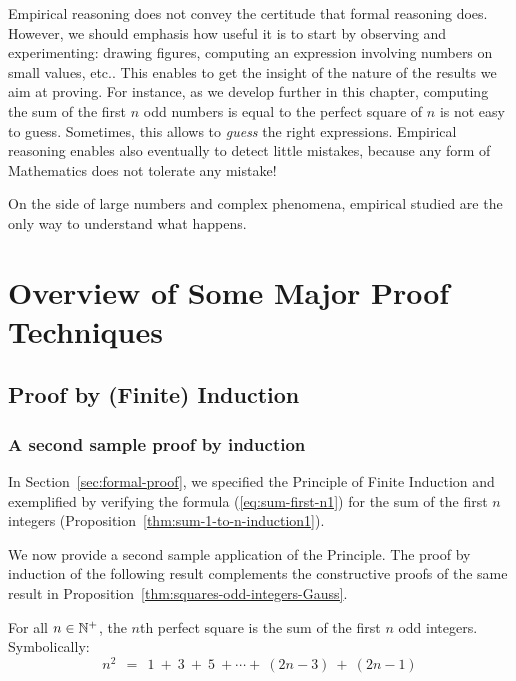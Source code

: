 Empirical reasoning does not convey the certitude that formal reasoning does.  
However, we should emphasis how useful it is to start by observing and experimenting:
drawing figures, computing an expression involving numbers on small values, etc..
This enables to get the insight of the nature of the results we aim at proving.
For instance, as we develop further in this chapter, computing the sum of the first $n$ odd numbers is equal to the perfect square of $n$
is not easy to guess.
Sometimes, this allows to \textit{guess} the right expressions.
Empirical reasoning enables also eventually to detect little mistakes, 
because any form of Mathematics does not tolerate any mistake!



On the side of large numbers and complex phenomena, empirical studied are the only way to understand what happens. 



\section{Overview of Some Major Proof Techniques}
\label{sec:major-proof-techniques}

\subsection{Proof by (Finite) Induction}
\label{sec:Induction}

\subsubsection{A second sample proof by induction}

In Section~\ref{sec:formal-proof}, we specified the Principle of
Finite Induction  and
exemplified by verifying the formula (\ref{eq:sum-first-n1}) for the
sum of the first $n$ integers
(Proposition~\ref{thm:sum-1-to-n-induction1}).

We now provide a second sample application of the Principle.  The
proof by induction of the following result complements the
constructive proofs of the same result in
Proposition~\ref{thm:squares-odd-integers-Gauss}.

\begin{prop}
\label{thm:squares-odd-integers-induction1}
For all $n \in \mathbb{N}^+$, the $n$th perfect square is the sum of the first
$n$ odd integers.  Symbolically:
\[
n^2 \ \ = \ \
1 \ + \ 3 \ + \ 5 \ + \cdots + \ (2n-3) \ + \ (2n-1)
\]
\end{prop}

